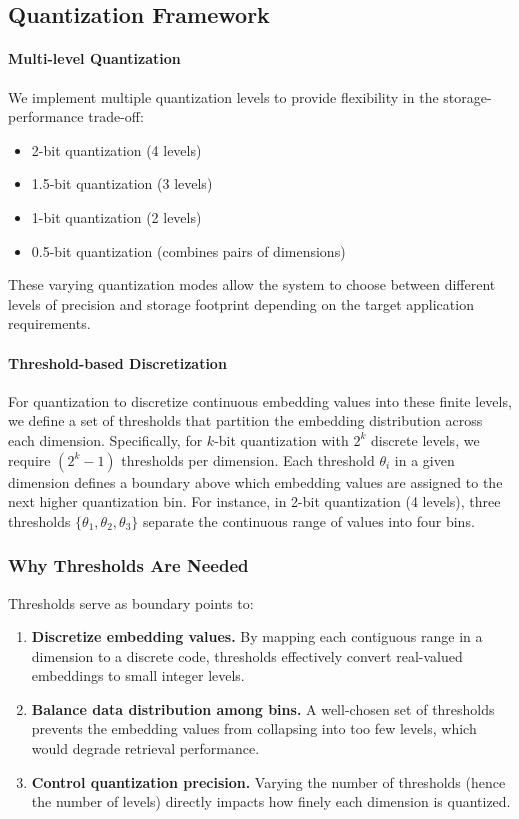 
\subsection{Quantization Framework}

\paragraph{Multi-level Quantization}
We implement multiple quantization levels to provide flexibility in the storage-performance trade-off:
\begin{itemize}
    \item 2-bit quantization (4 levels)
    \item 1.5-bit quantization (3 levels)
    \item 1-bit quantization (2 levels)
    \item 0.5-bit quantization (combines pairs of dimensions)
\end{itemize}
These varying quantization modes allow the system to choose between different levels of precision and storage footprint depending on the target application requirements.

\paragraph{Threshold-based Discretization}
For quantization to discretize continuous embedding values into these finite levels, we define a set of thresholds that partition the embedding distribution across each dimension. Specifically, for $k$-bit quantization with $2^k$ discrete levels, we require $(2^k - 1)$ thresholds per dimension. Each threshold $\theta_{i}$ in a given dimension defines a boundary above which embedding values are assigned to the next higher quantization bin. For instance, in 2-bit quantization (4 levels), three thresholds $\{\theta_1, \theta_2, \theta_3\}$ separate the continuous range of values into four bins.

\subsubsection{Why Thresholds Are Needed}
Thresholds serve as boundary points to:
\begin{enumerate}
    \item \textbf{Discretize embedding values.} By mapping each contiguous range in a dimension to a discrete code, thresholds effectively convert real-valued embeddings to small integer levels.
    \item \textbf{Balance data distribution among bins.} A well-chosen set of thresholds prevents the embedding values from collapsing into too few levels, which would degrade retrieval performance.
    \item \textbf{Control quantization precision.} Varying the number of thresholds (hence the number of levels) directly impacts how finely each dimension is quantized.
\end{enumerate}

